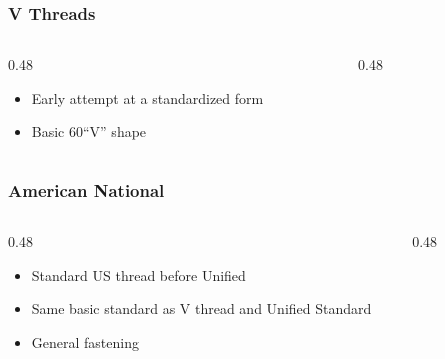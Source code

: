 \begin{frame}
	\frametitle{V Threads}

    \begin{columns}
        \begin{column}{0.48\linewidth}
            \begin{itemize}[<+- | alert@+>]
                \item Early attempt at a standardized form
                \item Basic 60\textdegree ``V'' shape
            \end{itemize}
        \end{column}
        \begin{column}{0.48\linewidth}
            \begin{figure}
                \centering
                \resizebox{\linewidth}{!}{
                    
                }
            \end{figure}
        \end{column}
    \end{columns}
\end{frame}

\begin{frame}
	\frametitle{American National}

    \begin{columns}
        \begin{column}{0.48\linewidth}
            \begin{itemize}[<+- | alert@+>]
                \item Standard US thread before Unified
                \item Same basic standard as V thread and Unified Standard
                \item General fastening
            \end{itemize}
        \end{column}
        \begin{column}{0.48\linewidth}
            \begin{figure}
                \centering
                \resizebox{\linewidth}{!}{
                    
                }
            \end{figure}
        \end{column}
    \end{columns}
\end{frame}

